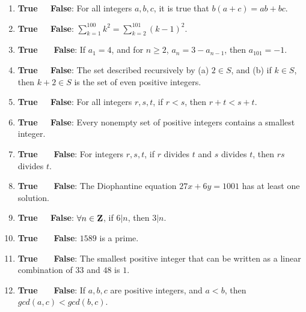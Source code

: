\documentclass[11pt]{amsart}
\begin{document}
\begin{enumerate}

\item  {\bf {\color{red}True} \ \  False}: For all integers $a,b,c$, it is true that $b(a+c) = ab + bc$.
\vfill

\item  {\bf {\color{red}True} \ \  False}: $\displaystyle \sum_{k=1}^{100} k^2 = \sum_{k=2}^{101} (k-1)^2$.

\vfill
 
\item  {\bf True \ \ {\color{red} False}}: If $a_1= 4$, and for $n\geq 2$, $a_n = 3-a_{n-1}$, then $a_{101} = -1$. 
 
\vfill
  
\item  {\bf {\color{red}True} \ \  False}: The set described recursively by (a) $2\in S$, and (b) if $k\in S$,
\vskip -1pt\hskip 82pt then $k+2\in S$ is the set of even positive integers.

\vfill

\item  {\bf {\color{red}True} \ \  False}: For all integers $r,s,t$, if $r<s$, then $r+t<s+t$.
 
 \vfill
 
\item  {\bf {\color{red}True} \ \  False}: Every nonempty set of positive integers contains a smallest integer.

\vfill
 
\item  {\bf True \ \ {\color{red}  False}}: For integers $r,s,t$, if $r$ divides $t$ and $s$ divides $t$, then $rs$ divides $t$.

\vfill
 
\item  {\bf True \ \ {\color{red} False}}:  The Diophantine equation $27x + 6y = 1001$ has at least one solution.
\vfill
  
\item  {\bf {\color{red}True} \ \  False}: $\forall n\in {\bf Z}$, if $6|n$, then $3|n$.
 
 \vfill
 
\item  {\bf True \ \ {\color{red}  False}}: $1589$ is a prime.

\vfill

\item  {\bf True \ \  {\color{red}  False}}: The smallest positive integer that can be written as a linear combination 
\vskip -1pt\hskip 85pt of $33$ and $48$ is $1$.
\vfill

\item  {\bf True \ \ {\color{red} False}}: If $a,b,c$ are positive integers, and $a<b$, then $gcd(a,c)<gcd(b,c)$.
 
 
\end{enumerate}
 \vfill
 \break
 
\end{document}
